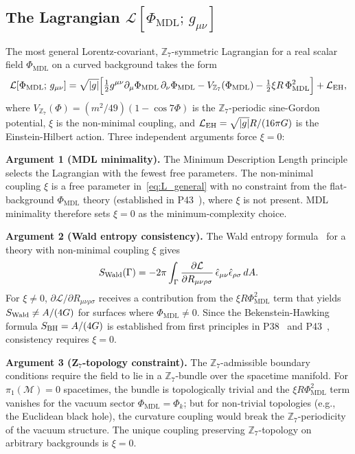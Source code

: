 \documentclass[11pt]{article}
\theoremstyle{remark}
\newcommand{\PHIMDL}{\Phi_{\mathrm{MDL}}}
\newcommand{\ZS}{\mathbb{Z}_7}
\newcommand{\LL}{\mathcal{L}}
\begin{document}
\subsection{The Lagrangian $\LL[\PHIMDL;\,g_{\mu\nu}]$}
\label{sec:lagrangian}

The most general Lorentz-covariant, $\ZS$-symmetric Lagrangian for a real scalar field
$\PHIMDL$ on a curved background takes the form
\begin{equation}
  \LL[\PHIMDL;\,g_{\mu\nu}] = \sqrt{|g|}\Bigl[
    \tfrac{1}{2}g^{\mu\nu}\partial_\mu\PHIMDL\,\partial_\nu\PHIMDL
    - V_{\ZS}(\PHIMDL) - \tfrac{1}{2}\xi R\,\PHIMDL^2
    \Bigr] + \LL_{\rm EH},
  \label{eq:L_general}
\end{equation}
where $V_{\ZS}(\Phi) = (m^2/49)(1-\cos 7\Phi)$ is the $\ZS$-periodic sine-Gordon
potential, $\xi$ is the non-minimal coupling, and $\LL_{\rm EH} = \sqrt{|g|}R/(16\pi G)$
is the Einstein-Hilbert action.  Three independent arguments force $\xi=0$:

\smallskip\noindent\textbf{Argument 1 (MDL minimality).}  The Minimum Description Length
principle selects the Lagrangian with the fewest free parameters.  The non-minimal
coupling $\xi$ is a free parameter in~\eqref{eq:L_general} with no constraint from the
flat-background $\PHIMDL$ theory (established in P43~\cite{SpivackCompleteness}),
where $\xi$ is not present.  MDL minimality therefore sets $\xi = 0$ as the
minimum-complexity choice.

\smallskip\noindent\textbf{Argument 2 (Wald entropy consistency).}  The Wald entropy
formula~\cite{Wald1993} for a theory with non-minimal coupling $\xi$ gives
\begin{equation}
  S_{\rm Wald}(\Gamma) = -2\pi\int_\Gamma \frac{\partial\LL}{\partial R_{\mu\nu\rho\sigma}}
  \,\hat{\epsilon}_{\mu\nu}\hat{\epsilon}_{\rho\sigma}\,dA.
\end{equation}
For $\xi\neq 0$, $\partial\LL/\partial R_{\mu\nu\rho\sigma}$ receives a contribution
from the $\xi R\PHIMDL^2$ term that yields $S_{\rm Wald}\neq A/(4G)$ for surfaces where
$\PHIMDL\neq 0$.  Since the Bekenstein-Hawking formula $S_{\rm BH} = A/(4G)$ is
established from first principles in P38~\cite{SpivackPhiMDLGravity} and
P43~\cite{SpivackCompleteness}, consistency requires $\xi = 0$.

\smallskip\noindent\textbf{Argument 3 (Z$_7$-topology constraint).}  The $\ZS$-admissible
boundary conditions require the field to lie in a $\ZS$-bundle over the spacetime
manifold.  For $\pi_1(\mathcal{M})=0$ spacetimes, the bundle is topologically trivial and
the $\xi R\PHIMDL^2$ term vanishes for the vacuum sector $\PHIMDL = \Phi_k$; but for
non-trivial topologies (e.g., the Euclidean black hole), the curvature coupling would
break the $\ZS$-periodicity of the vacuum structure.  The unique coupling preserving
$\ZS$-topology on arbitrary backgrounds is $\xi=0$.
\end{document}

